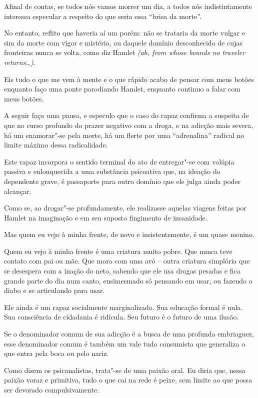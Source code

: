 Afinal de contas, se todos nós vamos morrer um dia, a todos nós
indistintamente interessa especular a respeito do que seria essa ``brisa
da morte''.

No entanto, reflito que haveria aí um porém: não se trataria da morte
vulgar e sim da morte com vigor e mistério, ou daquele domínio
desconhecido de cujas fronteiras nunca se volta, como diz Hamlet
\emph{(ah, from whose bounds no traveler returns…).}

Eis tudo o que me vem à mente e o que rápido acabo de pensar com meus
botões enquanto faço uma ponte parodiando Hamlet, enquanto continuo a
falar com meus botões.

\asterisc{}

A seguir faço uma pausa, e especulo que o caso do rapaz confirma a
suspeita de que no curso profundo do prazer negativo com a droga, e na
adicção mais severa, há um enamorar"-se pela morte, há um flerte por uma
``adrenalina'' radical no limite máximo dessa radicalidade.

Este rapaz incorpora o sentido terminal do ato de entregar"-se com
volúpia passiva e enlouquecida a uma substância psicoativa que, na
ideação do dependente grave, é passaporte para outro domínio que ele
julga ainda poder alcançar.

Como se, ao drogar"-se profundamente, ele realizasse aquelas viagens
feitas por Hamlet na imaginação e em seu suposto fingimento de
insanidade.

\asterisc{}

Mas quem eu vejo à minha frente, de novo e insistentemente, é um quase
menino.

Quem eu vejo à minha frente é uma criatura muito pobre. Que nunca teve
contato com pai ou mãe. Que mora com uma avó -- outra criatura simplória
que se desespera com a inação do neto, sabendo que ele usa drogas
pesadas e fica grande parte do dia num canto, ensimesmado só pensando em
usar, ou fazendo o diabo e se articulando para usar.

Ele ainda é um rapaz socialmente marginalizado. Sua educação formal é
nula. Sua consciência de cidadania é ridícula. Seu futuro é o futuro de
uma ilusão.

Se o denominador comum de sua adicção é a busca de uma profunda
embriaguez, esse denominador comum é também um vale tudo consumista que
generaliza o que entra pela boca ou pelo nariz.

Como dizem os psicanalistas, trata"-se de uma paixão oral. Eu diria que,
nessa paixão voraz e primitiva, tudo o que cai na rede é peixe, sem
limite ao que possa ser devorado compulsivamente.


